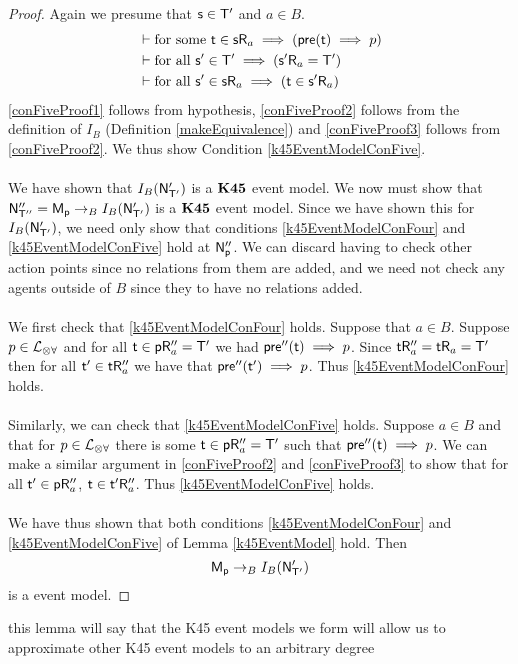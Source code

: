 \begin{proof}
	Again we presume that $\mathrm{\mathsf{s}} \in \mathrm{\mathsf{T}}'$ and $a \in B$.
	\begin{align}
		& \vdash \text{for some } \mathrm{\mathsf{t}} \in \mathrm{\mathsf{s}} \mathrm{\mathsf{R}}_a \implies (\mathrm{\mathsf{pre}}(\mathrm{\mathsf{t}}) \implies p)
		\label{conFiveProof1} \\
		& \vdash \text{for all } \mathrm{\mathsf{s}}' \in \mathrm{\mathsf{T}}' \implies (\mathrm{\mathsf{s}}' \mathrm{\mathsf{R}}_a = \mathrm{\mathsf{T}}') \label{conFiveProof2}
		\\
		& \vdash \text{for all } \mathrm{\mathsf{s}}' \in \mathrm{\mathsf{s}} \mathrm{\mathsf{R}}_a \implies (\mathrm{\mathsf{t}} \in \mathrm{\mathsf{s}}' \mathrm{\mathsf{R}}_a)
		\label{conFiveProof3}
	\end{align}
	\ref{conFiveProof1} follows from hypothesis, \ref{conFiveProof2} follows from the definition of
	$I_B$ (Definition \ref{makeEquivalence}) and \ref{conFiveProof3} follows from \ref{conFiveProof2}.
	We thus show Condition \ref{k45EventModelConFive}.\\
	\\
	We have shown that $I_B(\mathrm{\mathsf{N}}'_{\mathrm{\mathsf{T}}'})$ is a $\bf K45$ event model.
	We now must show that $\mathrm{\mathsf{N}}''_{\mathrm{\mathsf{T}}''} = \mathrm{\mathsf{M_p}} \to_B I_B(\mathrm{\mathsf{N}}'_{\mathrm{\mathsf{T}}'})$ is a $\bf K45$ event
	model.
	Since we have shown this for $I_B(\mathrm{\mathsf{N}}'_{\mathrm{\mathsf{T}}'})$, we need only show that conditions
	\ref{k45EventModelConFour} and \ref{k45EventModelConFive} hold at $\mathrm{\mathsf{N}}''_\mathrm{\mathsf{p}}$.
	We can discard having to check other action points since no relations from them are added, and we
	need not check any agents outside of $B$ since they to have no relations added.\\
	\\
	We first check that \ref{k45EventModelConFour} holds.
	Suppose that $a \in B$.
	Suppose $p \in \mathcal{L}_{\otimes\forall}$ and for all $\mathrm{\mathsf{t}} \in \mathrm{\mathsf{p}} \mathrm{\mathsf{R}}''_a = \mathrm{\mathsf{T}}'$ we had
	$\mathrm{\mathsf{pre}}''(\mathrm{\mathsf{t}}) \implies	p$.
	Since $\mathrm{\mathsf{t}} \mathrm{\mathsf{R}}''_a = \mathrm{\mathsf{t}} \mathrm{\mathsf{R}}_a = \mathrm{\mathsf{T}}'$ then for all $\mathrm{\mathsf{t}}'	\in \mathrm{\mathsf{t}} \mathrm{\mathsf{R}}''_a$ we have that
	$\mathrm{\mathsf{pre}}''(\mathrm{\mathsf{t}}') \implies p$.
	Thus \ref{k45EventModelConFour} holds.\\
	\\
	Similarly, we can check that \ref{k45EventModelConFive} holds.
	Suppose $a \in B$ and that for $p \in \mathcal{L}_{\otimes\forall}$ there is some $\mathrm{\mathsf{t}} \in \mathrm{\mathsf{p}} \mathrm{\mathsf{R}}''_a = \mathrm{\mathsf{T}}'$
	such that $\mathrm{\mathsf{pre}}''(\mathrm{\mathsf{t}}) \implies p$.
	We can make a similar argument in \ref{conFiveProof2} and \ref{conFiveProof3} to show that for all
	$\mathrm{\mathsf{t}}' \in \mathrm{\mathsf{p}} \mathrm{\mathsf{R}}''_a$, $\mathrm{\mathsf{t}} \in \mathrm{\mathsf{t}}' \mathrm{\mathsf{R}}''_a$.
	Thus \ref{k45EventModelConFive} holds.\\
	\\
	We have thus shown that both conditions \ref{k45EventModelConFour} and \ref{k45EventModelConFive}
	of Lemma \ref{k45EventModel} hold.
	Then
	\[
		\mathrm{\mathsf{M}}_\mathrm{\mathsf{p}} \to_B I_B(\mathrm{\mathsf{N}}'_{\mathrm{\mathsf{T}}'})
	\]
	is a \AXKFF event model.
\end{proof}

\begin{lemma}
	\FIXME this lemma will say that the K45 event models we form will allow us to approximate other
	K45 event models to an arbitrary degree
\end{lemma}
